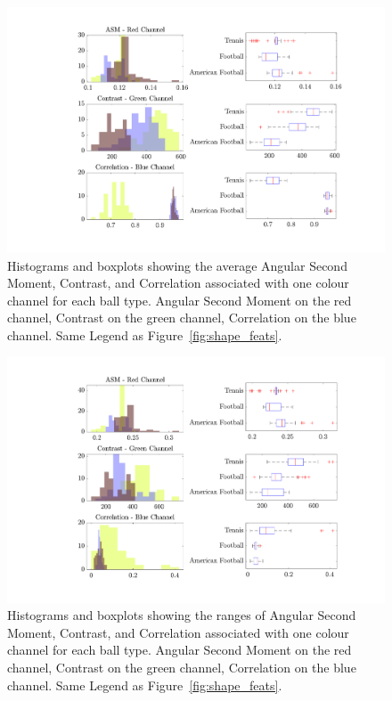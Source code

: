 \documentclass[conference]{IEEEtran}
\begin{document}
\begin{figure}[htbp]
    \centering
    \captionsetup{singlelinecheck=off}
    \includegraphics[width=\columnwidth]{figures/averages.pdf}
    \caption[]{Histograms and boxplots showing the average Angular Second Moment, Contrast, and Correlation associated with one colour channel for each ball type.
        Angular Second Moment on the red channel,
        Contrast on the green channel,
        Correlation on the blue channel. Same Legend as Figure~\ref{fig:shape_feats}.
        \label{fig:tex_feats_avgs}
    }
\end{figure}

\begin{figure}[htbp]
    \centering
    \includegraphics[width=\columnwidth]{figures/ranges.pdf}
    \caption[]{Histograms and boxplots showing the ranges of Angular Second Moment, Contrast, and Correlation associated with one colour channel for each ball type.
        Angular Second Moment on the red channel,
        Contrast on the green channel,
        Correlation on the blue channel. Same Legend as Figure~\ref{fig:shape_feats}.
        \label{fig:tex_feats_ranges}
    }
\end{figure}
\end{document}
